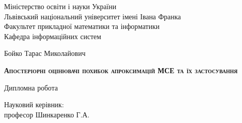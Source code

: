 \begin{titlepage}

\begin{center}
Міністерство освіти і науки України \\
Львівський національний університет імені Івана Франка\\
Факультет прикладної математики та інформатики\\
Кафедра інформаційних систем
\end{center}

\vspace{8em}

\begin{center}
Бойко Тарас Миколайович
\end{center}

\begin{center}
\large
\textsc{\textbf{Апостеріорні оцінювачі похибок апроксимацій МСЕ та їх застосування}}
\end{center}

\begin{center}
Дипломна робота
\end{center}

\vspace{12em}

\begin{flushright}
\begin{minipage}{0.4\textwidth}
Науковий керівник:\\
професор Шинкаренко Г.А.
\end{minipage}
\end{flushright}

\vspace{\fill}

\begin{center}
\end{center}

\end{titlepage}
